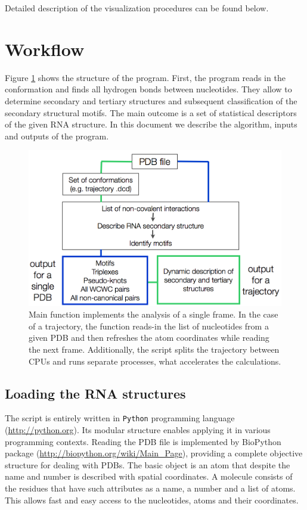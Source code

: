 \documentclass[12pt]{article}
\begin{document}
Detailed description of the visualization procedures can be found below.


\section{Workflow}
Figure \ref{ProgramScheme} shows the structure of the program. First, the program reads in the conformation and finds all hydrogen bonds between nucleotides. They allow to determine secondary and tertiary structures and subsequent classification of the secondary structural motifs. The main outcome is a set of statistical descriptors of the given RNA structure. In this document we  describe the algorithm, inputs and outputs of the program. 

\begin{figure}[h!]
\centering
\includegraphics[scale=0.4]{./pictures/workflow.png}
\caption{Main function implements the analysis of a single frame. In the case of a trajectory, the function reads-in the list of nucleotides from a given PDB and then refreshes the atom coordinates while reading the next frame. Additionally, the script splits the trajectory between CPUs and runs separate processes, what  accelerates the calculations.}
\label{ProgramScheme}
\end{figure}

\subsection{Loading the RNA structures}
The script is entirely written in {\tt Python} programming language (\url{http://python.org}). Its modular structure enables applying it in various programming contexts. Reading the PDB file is implemented by BioPython package (\url{http://biopython.org/wiki/Main_Page}), providing a complete objective structure for dealing with PDBs. The basic object is an atom that despite the name and number is described with spatial coordinates. A molecule consists of the residues that have such attributes as a name, a number and a list of atoms. This allows fast and easy access to the nucleotides, atoms and their coordinates.
\end{document}
